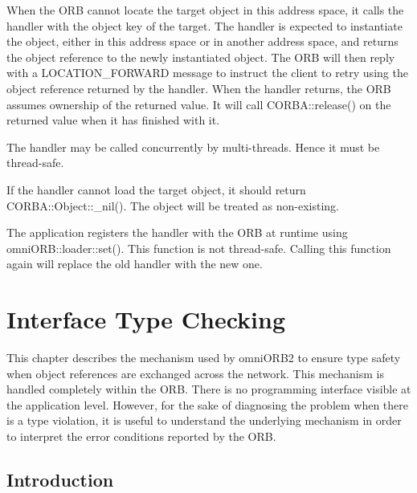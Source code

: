 \documentclass[11pt,twoside,onecolumn]{book}
\begin{document}
When the ORB cannot locate the target object in this address space, it
calls the handler with the object key of the target. The handler is expected
to instantiate the object, either in this address space or in another
address space, and returns the object reference to the newly instantiated
object. The ORB will then reply with a LOCATION\_FORWARD message to instruct
the client to retry using the object reference returned by the handler.
When the handler returns, the ORB assumes ownership of the returned
value. It will call CORBA::release() on the returned value when it has
finished with it.
                                                                      
The handler may be called concurrently by multi-threads. Hence it  
must be thread-safe.                                               
                                                                      
If the handler cannot load the target object, it should return     
CORBA::Object::\_nil(). The object will be treated as non-existing. 
                                                                      
The application registers the handler with the ORB at runtime      
using omniORB::loader::set(). This function is not thread-safe.    
Calling this function again will replace the old handler with      
the new one.                                                       


\chapter{Interface Type Checking}
\label{ch_intf}

This chapter describes the mechanism used by omniORB2 to ensure type safety
when object references are exchanged across the network. This mechanism is
handled completely within the ORB. There is no programming interface
visible at the application level. However, for the sake of diagnosing the
problem when there is a type violation, it is useful to understand the
underlying mechanism in order to interpret the error conditions reported by
the ORB.

\section{Introduction}
\end{document}
